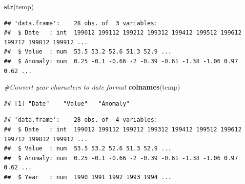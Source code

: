 \documentclass[12pt,]{article}
\newenvironment{Shaded}{\begin{snugshade}}{\end{snugshade}}
\newcommand{\KeywordTok}[1]{\textcolor[rgb]{0.13,0.29,0.53}{\textbf{#1}}}
\newcommand{\DataTypeTok}[1]{\textcolor[rgb]{0.13,0.29,0.53}{#1}}
\newcommand{\StringTok}[1]{\textcolor[rgb]{0.31,0.60,0.02}{#1}}
\newcommand{\CommentTok}[1]{\textcolor[rgb]{0.56,0.35,0.01}{\textit{#1}}}
\newcommand{\OperatorTok}[1]{\textcolor[rgb]{0.81,0.36,0.00}{\textbf{#1}}}
\newcommand{\NormalTok}[1]{#1}
\begin{document}
\begin{Shaded}
\begin{Highlighting}[]
\KeywordTok{str}\NormalTok{(temp)}
\end{Highlighting}
\end{Shaded}

\begin{verbatim}
## 'data.frame':    28 obs. of  3 variables:
##  $ Date   : int  199012 199112 199212 199312 199412 199512 199612 199712 199812 199912 ...
##  $ Value  : num  53.5 53.2 52.6 51.3 52.9 ...
##  $ Anomaly: num  0.25 -0.1 -0.66 -2 -0.39 -0.61 -1.38 -1.06 0.97 0.62 ...
\end{verbatim}

\begin{Shaded}
\begin{Highlighting}[]
\CommentTok{#Convert year characters to date format}
\KeywordTok{colnames}\NormalTok{(temp)}
\end{Highlighting}
\end{Shaded}

\begin{verbatim}
## [1] "Date"    "Value"   "Anomaly"
\end{verbatim}

\begin{Shaded}
\end{Shaded}

\begin{verbatim}
## 'data.frame':    28 obs. of  4 variables:
##  $ Date   : int  199012 199112 199212 199312 199412 199512 199612 199712 199812 199912 ...
##  $ Value  : num  53.5 53.2 52.6 51.3 52.9 ...
##  $ Anomaly: num  0.25 -0.1 -0.66 -2 -0.39 -0.61 -1.38 -1.06 0.97 0.62 ...
##  $ Year   : num  1990 1991 1992 1993 1994 ...
\end{verbatim}

\begin{Shaded}
\end{Shaded}
\end{document}
